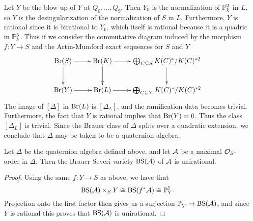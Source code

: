 Let $Y$ be the blow up of $Y$ at $Q_0,\dots, Q_9$.  Then $Y_0$ is the normalization of $\mathbb{P}^2_k$ in $L$, so $Y$ is the desingularization of the normalization of $S$ in $L$.  Furthermore, $Y$ is rational since it is birational to $Y_0$, which itself is rational because it is a quadric in $\mathbb{P}^3_k$.  Thus if we consider the commutative diagram induced by the morphism $f: Y\rightarrow S$ and the Artin-Mumford exact sequences for $S$ and $Y$
$$\xymatrix{
\Br(S) \ar[r]\ar[d] & \Br(K) \ar[r]\ar[d] & \bigoplus_{C\subseteq S} K(C)^*/K(C)^{*2}\ar[d]\\
\Br(Y) \ar[r] & \Br(L) \ar[r] & \bigoplus_{C\subseteq Y} K(C)^*/K(C)^{*2}
}$$
The image of $[\Delta]$ in $\textnormal{Br}(L)$ is $[\Delta_L]$, and the ramification data becomes trivial.  Furthermore, the fact that $Y$ is rational implies that $\textnormal{Br}(Y) =0$.  Thus the class $[\Delta_L]$ is trivial.  Since the Brauer class of $\Delta$ splits over a quadratic extension, we conclude that $\Delta$ may be taken to be a quaternion algebra.

\begin{lem}
Let $\Delta$ be the quaternion algebra defined above, and let $\mathcal{A}$ be a maximal $\mathcal{O}_S$-order in $\Delta$.  Then the Brauer-Severi variety $\textnormal{BS}(\mathcal{A})$ of $\mathcal{A}$ is unirational.
\end{lem}
\begin{proof}
Using the same $f: Y\rightarrow S$ as above, we have that
$$\textnormal{BS}(\mathcal{A})\times_S Y\cong \textnormal{BS}(f^*\mathcal{A}) \cong \mathbb{P}^1_Y.$$
Projection onto the first factor then gives us a surjection $\mathbb{P}^1_Y\rightarrow \textnormal{BS}(\mathcal{A})$, and since $Y$ is rational this proves that $\textnormal{BS}(\mathcal{A})$ is unirational.
\end{proof}
